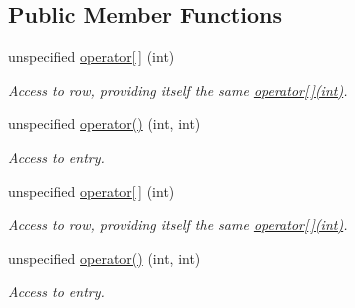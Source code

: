 \subsection*{Public Member Functions}
\begin{DoxyCompactItemize}
\item 
\hypertarget{structRFFGen_1_1Concepts_1_1MatrixConcept_a9edaafd682629e350028a6d943f98a2d}{unspecified \hyperlink{structRFFGen_1_1Concepts_1_1MatrixConcept_a9edaafd682629e350028a6d943f98a2d}{operator\mbox{[}$\,$\mbox{]}} (int)}\label{structRFFGen_1_1Concepts_1_1MatrixConcept_a9edaafd682629e350028a6d943f98a2d}

\begin{DoxyCompactList}\small\item\em Access to row, providing itself the same \hyperlink{structRFFGen_1_1Concepts_1_1MatrixConcept_a9edaafd682629e350028a6d943f98a2d}{operator\mbox{[}$\,$\mbox{]}(int)}. \end{DoxyCompactList}\item 
\hypertarget{structRFFGen_1_1Concepts_1_1MatrixConcept_a2f067ad171c8a9678b77fea11b6e7ec4}{unspecified \hyperlink{structRFFGen_1_1Concepts_1_1MatrixConcept_a2f067ad171c8a9678b77fea11b6e7ec4}{operator()} (int, int)}\label{structRFFGen_1_1Concepts_1_1MatrixConcept_a2f067ad171c8a9678b77fea11b6e7ec4}

\begin{DoxyCompactList}\small\item\em Access to entry. \end{DoxyCompactList}\item 
\hypertarget{structRFFGen_1_1Concepts_1_1MatrixConcept_a9edaafd682629e350028a6d943f98a2d}{unspecified \hyperlink{structRFFGen_1_1Concepts_1_1MatrixConcept_a9edaafd682629e350028a6d943f98a2d}{operator\mbox{[}$\,$\mbox{]}} (int)}\label{structRFFGen_1_1Concepts_1_1MatrixConcept_a9edaafd682629e350028a6d943f98a2d}

\begin{DoxyCompactList}\small\item\em Access to row, providing itself the same \hyperlink{structRFFGen_1_1Concepts_1_1MatrixConcept_a9edaafd682629e350028a6d943f98a2d}{operator\mbox{[}$\,$\mbox{]}(int)}. \end{DoxyCompactList}\item 
\hypertarget{structRFFGen_1_1Concepts_1_1MatrixConcept_a2f067ad171c8a9678b77fea11b6e7ec4}{unspecified \hyperlink{structRFFGen_1_1Concepts_1_1MatrixConcept_a2f067ad171c8a9678b77fea11b6e7ec4}{operator()} (int, int)}\label{structRFFGen_1_1Concepts_1_1MatrixConcept_a2f067ad171c8a9678b77fea11b6e7ec4}

\begin{DoxyCompactList}\small\item\em Access to entry. \end{DoxyCompactList}\end{DoxyCompactItemize}


